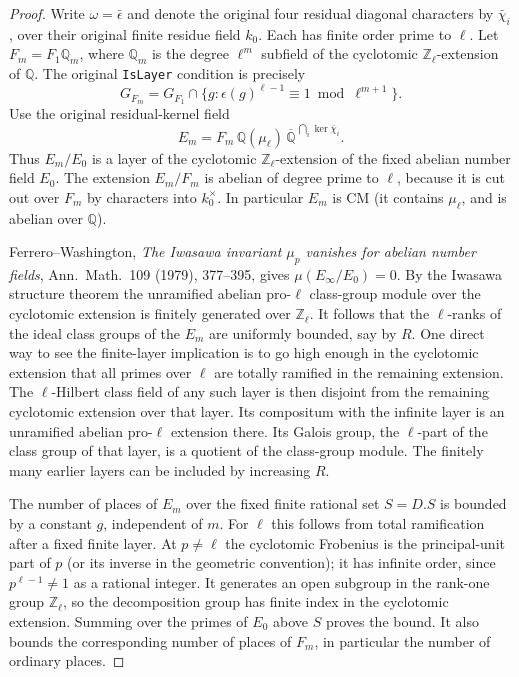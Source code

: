 \begin{proof}
Write $\omega=\bar\epsilon$ and denote the original four residual
diagonal characters by $\bar\chi_i$, over their original finite
residue field $k_0$. Each has finite order prime to $\ell$.
Let $F_m=F_1\mathbb Q_m$, where $\mathbb Q_m$ is the degree
$\ell^m$ subfield of the cyclotomic $\mathbb Z_\ell$-extension
of $\mathbb Q$. The original \texttt{IsLayer} condition is
precisely
\[
 G_{F_m}=G_{F_1}\cap
   \{g:\epsilon(g)^{\ell-1}\equiv1\bmod\ell^{m+1}\}.
\]
Use the original residual-kernel field
\[
 E_m=F_m\,\mathbb Q(\mu_\ell)\,
         \overline{\mathbb Q}^{\,\bigcap_i\ker\bar\chi_i}.
\]
Thus $E_m/E_0$ is a layer of the cyclotomic
$\mathbb Z_\ell$-extension of the fixed abelian number field
$E_0$. The extension $E_m/F_m$ is abelian of degree prime
to $\ell$, because it is cut out over $F_m$ by characters into
$k_0^\times$. In particular $E_m$ is CM (it contains
$\mu_\ell$, and is abelian over $\mathbb Q$).

Ferrero--Washington, \emph{The Iwasawa invariant $\mu_p$ vanishes
for abelian number fields}, Ann.\ Math.\ 109 (1979), 377--395,
gives $\mu(E_\infty/E_0)=0$. By the Iwasawa structure theorem
the unramified abelian pro-$\ell$ class-group module over the
cyclotomic extension is finitely generated over $\mathbb Z_\ell$.
It follows that the $\ell$-ranks of the ideal class groups
of the $E_m$ are uniformly bounded, say by $R$.
One direct way to see the finite-layer implication is to go
high enough in the cyclotomic extension that all primes over
$\ell$ are totally ramified in the remaining extension.
The $\ell$-Hilbert class field of any such layer is then
disjoint from the remaining cyclotomic extension over that
layer. Its compositum with the infinite layer is an unramified
abelian pro-$\ell$ extension there. Its Galois group, the
$\ell$-part of the class group of that layer, is a quotient
of the class-group module. The finitely many earlier layers
can be included by increasing $R$.

The number of places of $E_m$ over the fixed finite rational
set $S=D.S$ is bounded by a constant $g$, independent of $m$.
For $\ell$ this follows from total ramification after a fixed
finite layer. At $p\ne\ell$ the cyclotomic Frobenius is the
principal-unit part of $p$ (or its inverse in the geometric
convention); it has infinite order, since $p^{\ell-1}\ne1$
as a rational integer. It generates an open subgroup in the
rank-one group $\mathbb Z_\ell$, so the decomposition group
has finite index in the cyclotomic extension. Summing over
the primes of $E_0$ above $S$ proves the bound. It also bounds
the corresponding number of places of $F_m$, in particular
the number of ordinary places.


\end{proof}
